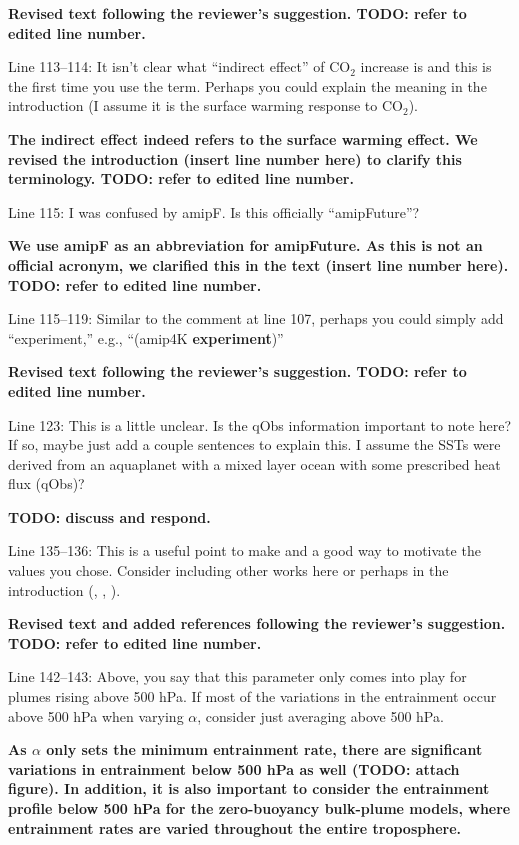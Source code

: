 \documentclass[11pt]{article}
\begin{document}
\textbf{Revised text following the reviewer's suggestion. TODO: refer to edited line number.}

Line 113--114: It isn't clear what ``indirect effect'' of CO\(_2\) increase is and this is the first time you use the term. Perhaps you could explain the meaning in the introduction (I assume it is the surface warming response to CO\(_2\)).

\textbf{The indirect effect indeed refers to the surface warming effect. We revised the introduction (insert line number here) to clarify this terminology. TODO: refer to edited line number.}

Line 115: I was confused by amipF. Is this officially ``amipFuture''?

\textbf{We use amipF as an abbreviation for amipFuture. As this is not an official acronym, we clarified this in the text (insert line number here). TODO: refer to edited line number.}

Line 115--119: Similar to the comment at line 107, perhaps you could simply add ``experiment,'' e.g., ``(amip4K \textbf{experiment})''

\textbf{Revised text following the reviewer's suggestion. TODO: refer to edited line number.}

Line 123: This is a little unclear. Is the qObs information important to note here? If so, maybe just add a couple sentences to explain this. I assume the SSTs were derived from an aquaplanet with a mixed layer ocean with some prescribed heat flux (qObs)?

\textbf{TODO: discuss and respond.}

Line 135--136: This is a useful point to make and a good way to motivate the values you chose. Consider including other works here or perhaps in the introduction (\cite{jang_simulation_2013}, \cite{ham_what_2013}, \cite{kim_ninosouthern_2011}).

\textbf{Revised text and added references following the reviewer's suggestion. TODO: refer to edited line number.}

Line 142--143: Above, you say that this parameter only comes into play for plumes rising above 500 hPa. If most of the variations in the entrainment occur above 500 hPa when varying \(\alpha\), consider just averaging above 500 hPa.

\textbf{As $\alpha$ only sets the minimum entrainment rate, there are significant variations in entrainment below 500 hPa as well (TODO: attach figure). In addition, it is also important to consider the entrainment profile below 500 hPa for the zero-buoyancy bulk-plume models, where entrainment rates are varied throughout the entire troposphere.}
\end{document}
